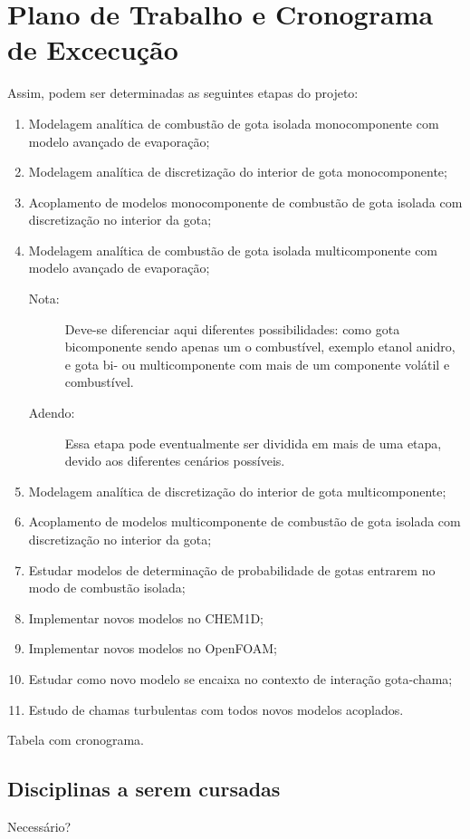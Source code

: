 \section{Plano de Trabalho e Cronograma de Excecução}


Assim, podem ser determinadas as seguintes etapas do projeto:

\begin{enumerate}
    \item Modelagem  analítica de combustão de gota isolada monocomponente com modelo avançado de evaporação;
    \item Modelagem  analítica de discretização do interior de gota monocomponente;
    \item Acoplamento de modelos monocomponente de combustão de gota isolada com discretização no interior da gota;
    \item Modelagem analítica de combustão de gota isolada multicomponente com modelo avançado de evaporação;
    \begin{description}
        \item[Nota:] Deve-se diferenciar aqui diferentes possibilidades: como gota bicomponente sendo apenas um o combustível, exemplo etanol anidro, e gota bi- ou multicomponente com mais de um componente volátil e combustível.
        \item[Adendo:] Essa etapa pode eventualmente ser dividida em mais de uma etapa, devido aos diferentes cenários possíveis. 
    \end{description}
    \item Modelagem analítica de discretização do interior de gota multicomponente;
    \item Acoplamento de modelos multicomponente de combustão de gota isolada com discretização no interior da gota;
    \item Estudar modelos de determinação de probabilidade de gotas entrarem no modo de combustão isolada;
    \item Implementar novos modelos no CHEM1D;
    \item Implementar novos modelos no OpenFOAM;
    \item Estudar como novo modelo se encaixa no contexto de interação gota-chama;
    \item Estudo de chamas turbulentas com todos novos modelos acoplados.
\end{enumerate}

Tabela com cronograma.

\subsection{Disciplinas a serem cursadas}

Necessário?